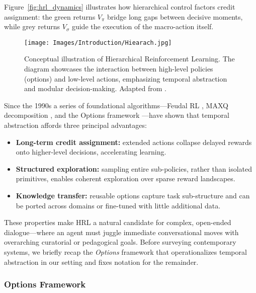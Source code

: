 \documentclass[12pt]{article}
\begin{document}
Figure~\ref{fig:hrl_dynamics} illustrates how hierarchical control
factors credit assignment: the green returns \(V_{\pi}\) bridge long
gaps between decisive moments, while grey returns \(V_{\sigma}\) guide
the execution of the macro-action itself.\\


\begin{figure}[h]
    \centering
    \texttt{[image: Images/Introduction/Hiearach.jpg]}
    \caption{Conceptual illustration of Hierarchical Reinforcement Learning. The diagram showcases the interaction between high-level policies (options) and low-level actions, emphasizing temporal abstraction and modular decision-making. Adapted from \citet{bougie2022hierarchical}.}
    \label{fig:hierarchal}
\end{figure}

Since the 1990s a series of foundational algorithms—Feudal RL
\citep{dayan1993feudal}, MAXQ decomposition \citep{dietterich2000maxq},
and the Options framework \citep{sutton1999between}—have shown that
temporal abstraction affords three principal advantages:

\begin{itemize}
    \item \textbf{Long-term credit assignment:} extended actions collapse
          delayed rewards onto higher-level decisions, accelerating learning.
    \item \textbf{Structured exploration:} sampling entire sub-policies, rather
          than isolated primitives, enables coherent exploration over sparse
          reward landscapes.
    \item \textbf{Knowledge transfer:} reusable options capture task
          sub-structure and can be ported across domains or fine-tuned
          with little additional data.
\end{itemize}

These properties make HRL a natural candidate for complex, open-ended dialogue—where an agent must juggle immediate conversational moves with overarching curatorial or pedagogical goals. Before surveying contemporary systems, we briefly recap the \emph{Options} framework that operationalizes temporal abstraction in our setting and fixes notation for the remainder.

\subsubsection{Options Framework}
\end{document}
